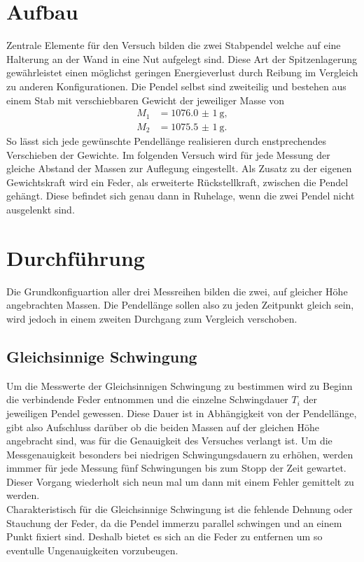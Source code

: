 \section{Aufbau}
Zentrale Elemente für den Versuch bilden die zwei Stabpendel welche auf eine Halterung an der Wand in eine Nut aufgelegt sind.
Diese Art der Spitzenlagerung gewährleistet einen möglichst geringen Energieverlust durch Reibung im Vergleich zu anderen Konfigurationen. 
Die Pendel selbst sind zweiteilig und bestehen aus einem Stab mit verschiebbaren Gewicht der jeweiliger Masse von 
\begin{align*}
    M_1 &= \SI{1076,0(1)}{\g}, \\
    M_2 &= \SI{1075,5(1)}{\g}.
\end{align*}
So lässt sich jede gewünschte Pendellänge realisieren durch enstprechendes Verschieben der Gewichte. Im folgenden Versuch wird 
für jede Messung der gleiche Abstand der Massen zur Auflegung eingestellt.
Als Zusatz zu der eigenen Gewichtskraft wird ein Feder, als erweiterte Rückstellkraft, zwischen die Pendel gehängt. 
Diese befindet sich genau dann in Ruhelage, wenn die zwei Pendel nicht ausgelenkt sind. 

\section{Durchführung}
Die Grundkonfiguartion aller drei Messreihen bilden die zwei, auf gleicher Höhe angebrachten Massen. Die Pendellänge sollen also zu jeden Zeitpunkt
gleich sein, wird jedoch in einem zweiten Durchgang zum Vergleich verschoben.

\subsection{Gleichsinnige Schwingung}
Um die Messwerte der Gleichsinnigen Schwingung zu bestimmen wird zu Beginn die verbindende Feder entnommen und 
die einzelne Schwingdauer $T_i$ der jeweiligen Pendel gewessen. Diese Dauer ist in Abhängigkeit von der Pendellänge, gibt also 
Aufschluss darüber ob die beiden Massen auf der gleichen Höhe angebracht sind, was für die Genauigkeit des Versuches verlangt ist.
Um die Messgenauigkeit besonders bei niedrigen Schwingungsdauern zu erhöhen, werden immmer für jede Messung fünf Schwingungen 
bis zum Stopp der Zeit gewartet. Dieser Vorgang wiederholt sich neun mal um dann mit einem Fehler gemittelt zu werden. 
\\
\newline
Charakteristisch für die Gleichsinnige Schwingung ist die fehlende Dehnung oder Stauchung der Feder, da die Pendel immerzu 
parallel schwingen und an einem Punkt fixiert sind. Deshalb bietet es sich an die Feder zu entfernen um so eventulle Ungenauigkeiten 
vorzubeugen.


